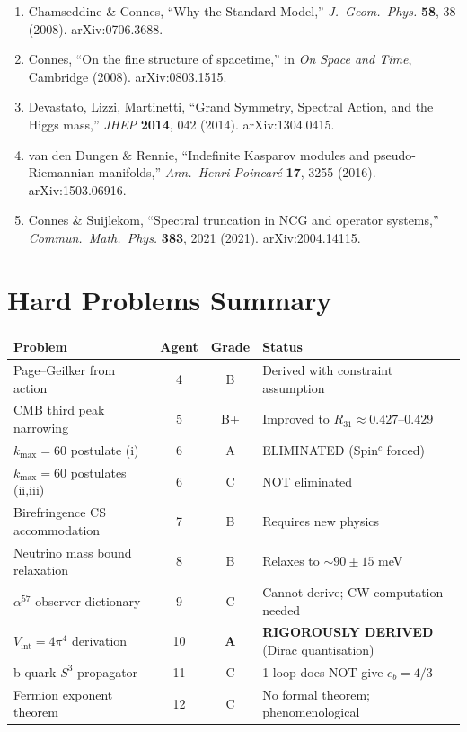 \documentclass[11pt,a4paper]{article}
\begin{document}
\begin{enumerate}
\item Chamseddine \& Connes, ``Why the Standard Model,'' \textit{J.\ Geom.\ Phys.} \textbf{58}, 38 (2008). arXiv:0706.3688.
\item Connes, ``On the fine structure of spacetime,'' in \textit{On Space and Time}, Cambridge (2008). arXiv:0803.1515.
\item Devastato, Lizzi, Martinetti, ``Grand Symmetry, Spectral Action, and the Higgs mass,'' \textit{JHEP} \textbf{2014}, 042 (2014). arXiv:1304.0415.
\item van den Dungen \& Rennie, ``Indefinite Kasparov modules and pseudo-Riemannian manifolds,'' \textit{Ann.\ Henri Poincar\'e} \textbf{17}, 3255 (2016). arXiv:1503.06916.
\item Connes \& Suijlekom, ``Spectral truncation in NCG and operator systems,'' \textit{Commun.\ Math.\ Phys.} \textbf{383}, 2021 (2021). arXiv:2004.14115.
\end{enumerate}


\section*{Hard Problems Summary}

\begin{center}
\begin{longtable}{lccl}
\toprule
\textbf{Problem} & \textbf{Agent} & \textbf{Grade} & \textbf{Status} \\
\midrule
Page--Geilker from action & 4 & B & Derived with constraint assumption \\
CMB third peak narrowing & 5 & B+ & Improved to $R_{31} \approx 0.427$--$0.429$ \\
$k_{\max} = 60$ postulate (i) & 6 & A & ELIMINATED (Spin$^c$ forced) \\
$k_{\max} = 60$ postulates (ii,iii) & 6 & C & NOT eliminated \\
Birefringence CS accommodation & 7 & B & Requires new physics \\
Neutrino mass bound relaxation & 8 & B & Relaxes to $\sim 90 \pm 15$ meV \\
$\alpha^{57}$ observer dictionary & 9 & C & Cannot derive; CW computation needed \\
$V_{\mathrm{int}} = 4\pi^4$ derivation & 10 & \textbf{A} & \textbf{RIGOROUSLY DERIVED} (Dirac quantisation) \\
b-quark $S^3$ propagator & 11 & C & 1-loop does NOT give $c_b = 4/3$ \\
Fermion exponent theorem & 12 & C & No formal theorem; phenomenological \\
\bottomrule
\end{longtable}
\end{center}
\end{document}
